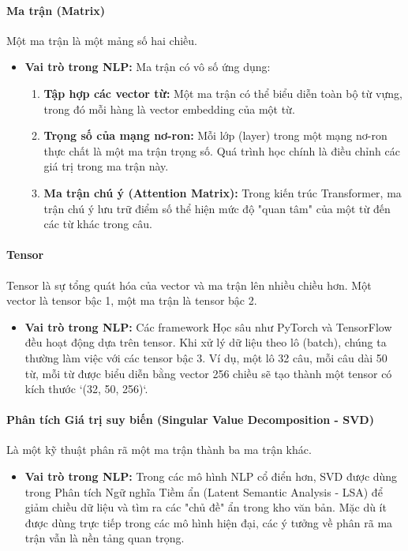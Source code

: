 \paragraph{Ma trận (Matrix)}
Một ma trận là một mảng số hai chiều.
\begin{itemize}
    \item \textbf{Vai trò trong NLP:} Ma trận có vô số ứng dụng:
        \begin{enumerate}
            \item \textbf{Tập hợp các vector từ:} Một ma trận có thể biểu diễn toàn bộ từ vựng, trong đó mỗi hàng là vector embedding của một từ.
            \item \textbf{Trọng số của mạng nơ-ron:} Mỗi lớp (layer) trong một mạng nơ-ron thực chất là một ma trận trọng số. Quá trình học chính là điều chỉnh các giá trị trong ma trận này.
            \item \textbf{Ma trận chú ý (Attention Matrix):} Trong kiến trúc Transformer, ma trận chú ý lưu trữ điểm số thể hiện mức độ "quan tâm" của một từ đến các từ khác trong câu.
        \end{enumerate}
\end{itemize}

\paragraph{Tensor}
Tensor là sự tổng quát hóa của vector và ma trận lên nhiều chiều hơn. Một vector là tensor bậc 1, một ma trận là tensor bậc 2.
\begin{itemize}
    \item \textbf{Vai trò trong NLP:} Các framework Học sâu như PyTorch và TensorFlow đều hoạt động dựa trên tensor. Khi xử lý dữ liệu theo lô (batch), chúng ta thường làm việc với các tensor bậc 3. Ví dụ, một lô 32 câu, mỗi câu dài 50 từ, mỗi từ được biểu diễn bằng vector 256 chiều sẽ tạo thành một tensor có kích thước `(32, 50, 256)`.
\end{itemize}

\paragraph{Phân tích Giá trị suy biến (Singular Value Decomposition - SVD)}
Là một kỹ thuật phân rã một ma trận thành ba ma trận khác.
\begin{itemize}
    \item \textbf{Vai trò trong NLP:} Trong các mô hình NLP cổ điển hơn, SVD được dùng trong Phân tích Ngữ nghĩa Tiềm ẩn (Latent Semantic Analysis - LSA) để giảm chiều dữ liệu và tìm ra các "chủ đề" ẩn trong kho văn bản. Mặc dù ít được dùng trực tiếp trong các mô hình hiện đại, các ý tưởng về phân rã ma trận vẫn là nền tảng quan trọng.
\end{itemize}

